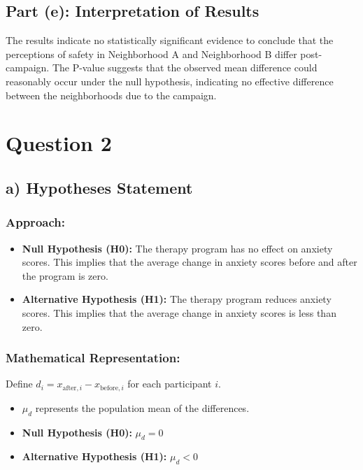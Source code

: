 \documentclass{article}
\begin{document}
\subsection*{Part (e): Interpretation of Results}
The results indicate no statistically significant evidence to conclude that the perceptions of safety in Neighborhood A and Neighborhood B differ post-campaign. The P-value suggests that the observed mean difference could reasonably occur under the null hypothesis, indicating no effective difference between the neighborhoods due to the campaign.

\newpage
\section*{Question 2}

\subsection*{a) Hypotheses Statement}

\subsubsection*{Approach:}
\begin{itemize}
    \item \textbf{Null Hypothesis (H0):} The therapy program has no effect on anxiety scores. This implies that the average change in anxiety scores before and after the program is zero.
    \item \textbf{Alternative Hypothesis (H1):} The therapy program reduces anxiety scores. This implies that the average change in anxiety scores is less than zero.
\end{itemize}

\subsubsection*{Mathematical Representation:}
Define \( d_i = x_{\text{after},i} - x_{\text{before},i} \) for each participant \( i \).
\begin{itemize}
    \item \(\mu_d\) represents the population mean of the differences.
    \item \textbf{Null Hypothesis (H0):} \( \mu_d = 0 \)
    \item \textbf{Alternative Hypothesis (H1):} \( \mu_d < 0 \)
\end{itemize}
\end{document}
